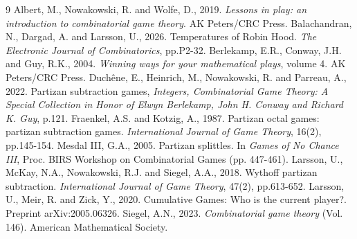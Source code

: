 \documentclass[oneside,reqno]{amsart}
\begin{document}

\begin{thebibliography}{9}
 Albert, M., Nowakowski, R. and Wolfe, D., 2019. {\em Lessons in play: an introduction to combinatorial game theory}. AK Peters/CRC Press.
 Balachandran, N., Dargad, A. and Larsson, U., 2026. Temperatures of Robin Hood. {\em The Electronic Journal of Combinatorics}, pp.P2-32.
 Berlekamp, E.R., Conway, J.H. and Guy, R.K., 2004. {\em Winning ways for your mathematical plays}, volume 4. AK Peters/CRC Press.
 Duchêne, E., Heinrich, M., Nowakowski, R. and Parreau, A., 2022. Partizan subtraction games, {\em Integers, Combinatorial Game Theory: A Special Collection in Honor of Elwyn Berlekamp, John H. Conway and Richard K. Guy}, p.121.
 Fraenkel, A.S. and Kotzig, A., 1987. Partizan octal games: partizan subtraction games. {\em International Journal of Game Theory}, 16(2), pp.145-154.
 Mesdal III, G.A., 2005. Partizan splittles. In {\em Games of No Chance III}, Proc. BIRS Workshop on Combinatorial Games (pp. 447-461).
 Larsson, U., McKay, N.A., Nowakowski, R.J. and Siegel, A.A., 2018. Wythoff partizan subtraction. {\em International Journal of Game Theory}, 47(2), pp.613-652.
 Larsson, U., Meir, R. and Zick, Y., 2020. Cumulative Games: Who is the current player?.  Preprint arXiv:2005.06326.
 Siegel, A.N., 2023. {\em Combinatorial game theory} (Vol. 146). American Mathematical Society.
\end{thebibliography}
\end{document}
